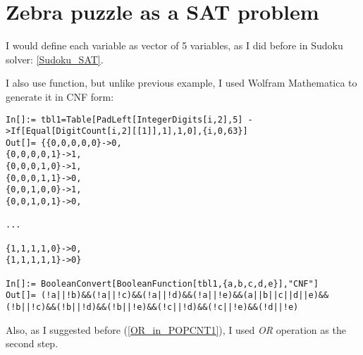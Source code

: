 \section{Zebra puzzle as a SAT problem}
\label{Zebra_SAT}

I would define each variable as vector of 5 variables, as I did before in Sudoku solver: \ref{Sudoku_SAT}.

I also use  function, but unlike previous example, I used Wolfram Mathematica to generate it in CNF form:

\begin{lstlisting}
In[]:= tbl1=Table[PadLeft[IntegerDigits[i,2],5] ->If[Equal[DigitCount[i,2][[1]],1],1,0],{i,0,63}]
Out[]= {{0,0,0,0,0}->0,
{0,0,0,0,1}->1,
{0,0,0,1,0}->1,
{0,0,0,1,1}->0,
{0,0,1,0,0}->1,
{0,0,1,0,1}->0,

...

{1,1,1,1,0}->0,
{1,1,1,1,1}->0}

In[]:= BooleanConvert[BooleanFunction[tbl1,{a,b,c,d,e}],"CNF"]
Out[]= (!a||!b)&&(!a||!c)&&(!a||!d)&&(!a||!e)&&(a||b||c||d||e)&&(!b||!c)&&(!b||!d)&&(!b||!e)&&(!c||!d)&&(!c||!e)&&(!d||!e)
\end{lstlisting}

Also, as I suggested before (\ref{OR_in_POPCNT1}), I used \emph{OR} operation as the second step.

